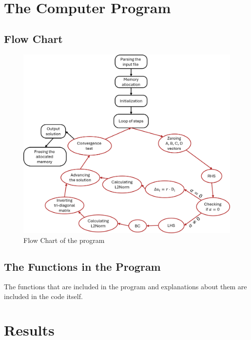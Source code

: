 \documentclass[11pt, a4paper]{article}
\begin{document}
\section{The Computer Program}
\subsection{Flow Chart}
\begin{figure}[H]
    \centering
    \includegraphics[width=\textwidth]{images/flow chart.png}
    \caption{Flow Chart of the program}
    \label{fig:fl_ch}
\end{figure}
\subsection{The Functions in the Program}
The functions that are included in the program and explanations about them are included in the code itself.

\newpage

\section{Results}
\end{document}
